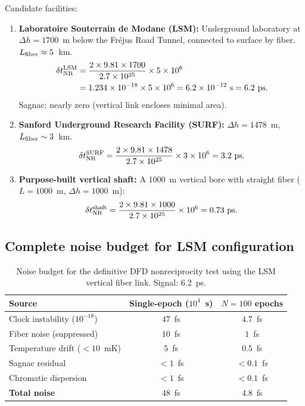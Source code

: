 \documentclass[aps,prl,twocolumn,superscriptaddress,showpacs]{revtex4-2}
\begin{document}
Candidate facilities:
\begin{enumerate}
\item \textbf{Laboratoire Souterrain de Modane (LSM):}
      Underground laboratory at $\Delta h = 1700$~m below the
      Fr\'ejus Road Tunnel, connected to surface by fiber.
      $L_{\rm fiber} \approx 5$~km.
      \begin{align}
      \delta t_{\rm NR}^{\rm LSM} &= \frac{2\times 9.81\times 1700}
      {2.7\times 10^{25}}\times 5\times 10^6 \nonumber\\
      &= 1.234\times 10^{-18}\times 5\times 10^6 = 6.2\times 10^{-12}~\text{s}
      = 6.2~\text{ps}.
      \end{align}
      Sagnac: nearly zero (vertical link encloses minimal area).

\item \textbf{Sanford Underground Research Facility (SURF):}
      $\Delta h = 1478$~m, $L_{\rm fiber} \sim 3$~km.
      \begin{equation}
      \delta t_{\rm NR}^{\rm SURF} = \frac{2\times 9.81\times 1478}
      {2.7\times 10^{25}}\times 3\times 10^6 = 3.2~\text{ps}.
      \end{equation}

\item \textbf{Purpose-built vertical shaft:}
      A 1000~m vertical bore with straight fiber ($L = 1000$~m,
      $\Delta h = 1000$~m):
      \begin{equation}
      \delta t_{\rm NR}^{\rm shaft} = \frac{2\times 9.81\times 1000}
      {2.7\times 10^{25}}\times 10^6 = 0.73~\text{ps}.
      \end{equation}
\end{enumerate}

\subsection{Complete noise budget for LSM configuration}

\begin{table}[t]
\caption{Noise budget for the definitive DFD nonreciprocity test
using the LSM vertical fiber link.  Signal: $6.2$~ps.}
\label{tab:noise_LSM}
\begin{ruledtabular}
\begin{tabular}{lcc}
Source & Single-epoch ($10^4$~s) & $N = 100$ epochs \\
\hline
Clock instability ($10^{-18}$) & $47$~fs & $4.7$~fs \\
Fiber noise (suppressed) & $10$~fs & $1$~fs \\
Temperature drift ($<10$~mK) & $5$~fs & $0.5$~fs \\
Sagnac residual & $<1$~fs & $<0.1$~fs \\
Chromatic dispersion & $<1$~fs & $<0.1$~fs \\
\hline
\textbf{Total noise} & $48$~fs & $4.8$~fs \\
\end{tabular}
\end{ruledtabular}
\end{table}
\end{document}
